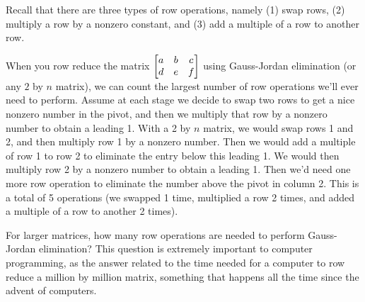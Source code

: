 \mysubsection{\ideagau}
Recall that there are three types of row operations, namely (1) swap rows, (2) multiply a row by a nonzero constant, and (3) add a multiple of a row to another row.  

When you row reduce the matrix $\begin{bmatrix} a&b&c\\d&e&f \end{bmatrix}$ using Gauss-Jordan elimination (or any $2$ by $n$ matrix), we can count the largest number of row operations we'll ever need to perform.  Assume at each stage we decide to swap two rows to get a nice nonzero number in the pivot, and then we multiply that row by a nonzero number to obtain a leading 1. 
With a 2 by $n$ matrix, we would swap rows 1 and 2, and then multiply row 1 by a nonzero number. Then we would add a multiple of row 1 to row 2 to eliminate the entry below this leading 1. We would then multiply row 2 by a nonzero number to obtain a leading 1. Then we'd need one more row operation to eliminate the number above the pivot in column 2. This is a total of 5 operations (we swapped 1 time, multiplied a row 2 times, and added a multiple of a row to another 2 times).  

For larger matrices, how many row operations are needed to perform Gauss-Jordan elimination?
This question is extremely important to computer programming, as the answer related to the time needed for a computer to row reduce a million by million matrix, something that happens all the time since the advent of computers.

